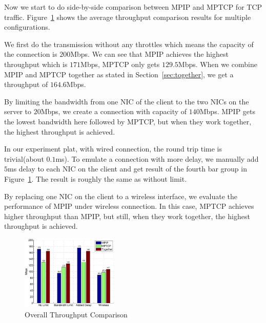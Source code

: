 Now we start to do side-by-side comparison between MPIP and MPTCP for TCP traffic. Figure~\ref{fig.tp_bar} shows the average throughput comparison results for multiple configurations. 

We first do the transmission without any throttles which means the capacity of the connection is $200$Mbps. We can see that MPIP achieves the highest throughput which is $171$Mbps, MPTCP only gets $129.5$Mbps. When we combine MPIP and MPTCP together as stated in Section~\ref{sec:together}, we get a throughput of $164.6$Mbps.


By limiting the bandwidth from one NIC of the client to the two NICs on the server to $20$Mbps, we create a connection with capacity of $140$Mbps. MPIP gets the lowest bandwidth here followed by MPTCP, but when they work together, the highest throughput is achieved.

In our experiment plat, with wired connection, the round trip time is trivial(about $0.1$ms). To emulate a connection with more delay, we manually add $5$ms delay to each NIC on the client and get result of the fourth bar group in Figure~\ref{fig.tp_bar}. The result is roughly the same as without limit.

By replacing one NIC on the client to a wireless interface, we evaluate the performance of MPIP under wireless connection. In this case, MPTCP achieves higher throughput than MPIP, but still, when they work together, the highest throughput is achieved.

\begin{figure}
\centering
\includegraphics[width=0.8\linewidth,height=1.4in]{fig/tp_bar.eps}
\caption{Overall Throughput Comparison}
\label{fig.tp_bar}
\end{figure}

